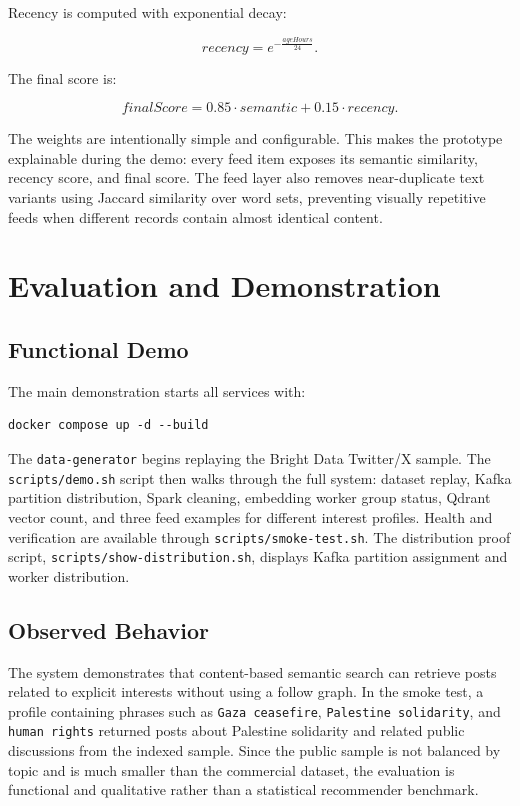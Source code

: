 \documentclass[conference]{IEEEtran}
\begin{document}
Recency is computed with exponential decay:

\begin{equation}
recency = e^{-\frac{ageHours}{24}}.
\end{equation}

The final score is:

\begin{equation}
finalScore = 0.85 \cdot semantic + 0.15 \cdot recency.
\end{equation}

The weights are intentionally simple and configurable. This makes the prototype explainable during the demo: every feed item exposes its semantic similarity, recency score, and final score. The feed layer also removes near-duplicate text variants using Jaccard similarity over word sets, preventing visually repetitive feeds when different records contain almost identical content.

\section{Evaluation and Demonstration}
\subsection{Functional Demo}
The main demonstration starts all services with:

\begin{verbatim}
docker compose up -d --build
\end{verbatim}

The \texttt{data-generator} begins replaying the Bright Data Twitter/X sample. The \texttt{scripts/demo.sh} script then walks through the full system: dataset replay, Kafka partition distribution, Spark cleaning, embedding worker group status, Qdrant vector count, and three feed examples for different interest profiles. Health and verification are available through \texttt{scripts/smoke-test.sh}. The distribution proof script, \texttt{scripts/show-distribution.sh}, displays Kafka partition assignment and worker distribution.

\subsection{Observed Behavior}
The system demonstrates that content-based semantic search can retrieve posts related to explicit interests without using a follow graph. In the smoke test, a profile containing phrases such as \texttt{Gaza ceasefire}, \texttt{Palestine solidarity}, and \texttt{human rights} returned posts about Palestine solidarity and related public discussions from the indexed sample. Since the public sample is not balanced by topic and is much smaller than the commercial dataset, the evaluation is functional and qualitative rather than a statistical recommender benchmark.
\end{document}
